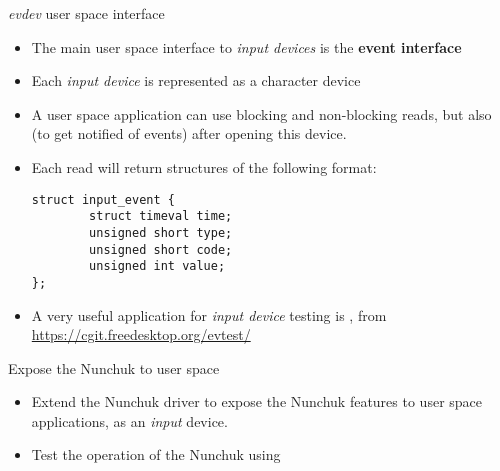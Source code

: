 \begin{frame}[fragile]{{\em evdev} user space interface}
  \begin{itemize}
  \item The main user space interface to {\em input devices} is the
    {\bf event interface}
  \item Each {\em input device} is represented as a
     character device
  \item A user space application can use blocking and non-blocking
    reads, but also  (to get notified of events) after
    opening this device.
  \item Each read will return  structures of the
    following format:
    \begin{block}{}
    \begin{verbatim}
struct input_event {
        struct timeval time;
        unsigned short type;
        unsigned short code;
        unsigned int value;
};
\end{verbatim}
\end{block}
\item A very useful application for {\em input device} testing is
  , from \url{https://cgit.freedesktop.org/evtest/}
  \end{itemize}
\end{frame}

\setuplabframe
{Expose the Nunchuk to user space}
{
  \begin{itemize}
  \item Extend the Nunchuk driver to expose the Nunchuk features to
    user space applications, as an {\em input} device.
  \item Test the operation of the Nunchuk using 
  \end{itemize}
}
